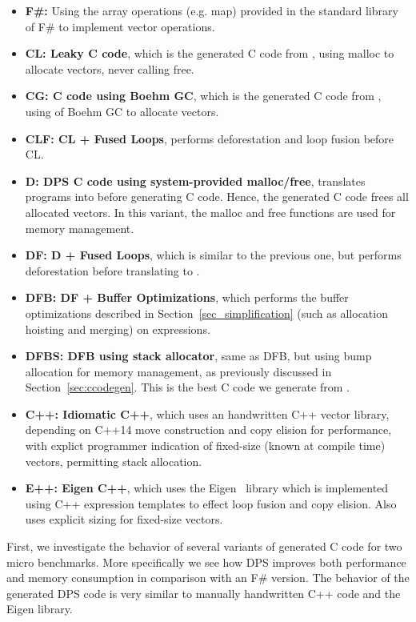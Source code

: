 \def\apara#1{\item {\bf #1}}
\begin{itemize}
\apara{F\#:} Using the array operations (e.g. map) provided in the standard library of F\# to implement vector operations.

\apara{CL: Leaky C code}, which is the generated C code from \lafsharp{}, using malloc to allocate vectors, never calling free.
\apara{CG: C code using Boehm GC}, which is the generated C code from \lafsharp{}, using  of Boehm GC to allocate vectors.

\apara{CLF: CL + Fused Loops}, performs deforestation and loop fusion before CL.

\apara{D: DPS C code using system-provided malloc/free}, translates \lafsharp{} programs into \salafsharp{} before generating C code. Hence, the generated C code frees all allocated vectors. In this variant, the malloc and free functions are used for memory management.

\apara{DF: D + Fused Loops}, which is similar to the previous one, but performs deforestation before translating to \salafsharp{}. 
\apara{DFB: DF + Buffer Optimizations}, which performs the buffer optimizations described in Section~\ref{sec_simplification} 
(such as allocation hoisting and merging) on \salafsharp{} expressions. 

\apara{DFBS: DFB using stack allocator}, same as DFB, but using bump allocation for memory management, as previously discussed in Section~\ref{sec:ccodegen}.
This is the best C code we generate from \lafsharp{}.

\apara{C++: Idiomatic C++}, which uses an handwritten C++ vector library, depending on C++14 move construction and copy elision for performance, with explict programmer indication of fixed-size (known at compile time) vectors, permitting stack allocation.

\apara{E++: Eigen C++}, which uses the Eigen~\cite{guennebaud2010eigen} library which is implemented using C++ expression templates to effect loop fusion and copy elision. Also uses explicit sizing for fixed-size vectors.
\end{itemize}

First, we investigate the behavior of several variants of generated C code for two micro benchmarks. More specifically we see how DPS improves both performance and memory consumption in comparison with an F\# version. The behavior of the generated DPS code is very similar to manually handwritten C++ code and the Eigen library.


